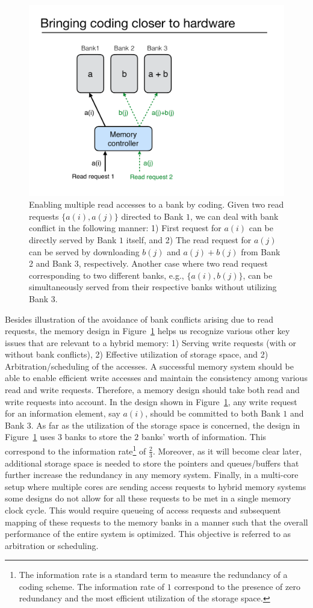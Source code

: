 \begin{figure}[t!]
\centering
\includegraphics[width=0.395\linewidth]{fig/example-xor.pdf}
\caption{Enabling multiple read accesses to a bank by coding. Given two read requests $\{a(i), a(j)\}$ directed to Bank $1$, we can deal with bank conflict in the following manner: 1) First request for $a(i)$ can be directly served by Bank $1$ itself, and 2) The read request for $a(j)$ can be served by downloading $b(j)$ and $a(j) + b(j)$ from Bank 2 and Bank 3, respectively. Another case where two read request corresponding to two different banks, e.g., $\{a(i), b(j)\}$, can be simultaneously served from their respective banks without utilizing Bank $3$.}
\label{fig:example_xor}
\end{figure}

Besides illustration of the avoidance of bank conflicts arising due to read requests, the memory design in Figure~\ref{fig:example_xor} helps us recognize various other key issues that are relevant to a hybrid memory: 1) Serving write requests (with or without bank conflicts), 2) Effective utilization of storage space, and 2) Arbitration/scheduling of the accesses. A successful memory system should be able to enable efficient write accesses and maintain the consistency among various read and write requests. Therefore, a memory design should take both read and write requests into account. In the design shown in Figure~\ref{fig:example_xor}, any write request for an information element, say $a(i)$, should be committed to both Bank $1$ and Bank $3$. As far as the utilization of the storage space is concerned, the design in Figure~\ref{fig:example_xor} uses $3$ banks to store the $2$ banks' worth of information. This correspond to the information rate\footnote{The information rate is a standard term to measure the redundancy of a coding scheme. The information rate of $1$ correspond to the presence of zero redundancy and the most efficient utilization of the storage space.} of $\frac{2}{3}$. Moreover, as it will become clear later, additional storage space is needed to store the pointers and queues/buffers that further increase the redundancy in any memory system. {\color{red}Finally, in a multi-core setup where multiple cores are sending access requests to hybrid memory systems some designs do not allow for all these requests to be met in a single memory clock cycle. This would require queueing of access requests and subsequent mapping of these requests to the memory banks in a manner such that the overall performance of the entire system is optimized. This objective is referred to as arbitration or scheduling.} \\

